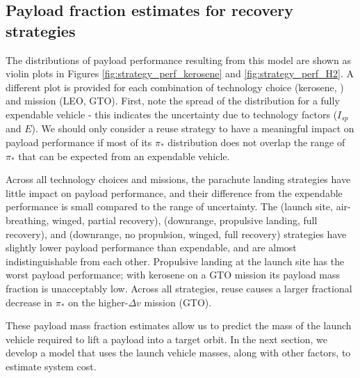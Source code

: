 \documentclass[conf]{new-aiaa}
\begin{document}
\begin{multicols}{2}
\subsection{Payload fraction estimates for recovery strategies}
The distributions of payload performance resulting from this model are shown as violin plots in Figures \ref{fig:strategy_perf_kerosene} and \ref{fig:strategy_perf_H2}. A different plot is provided for each combination of technology choice (kerosene, ) and mission (LEO, GTO). First, note the spread of the distribution for a fully expendable vehicle - this indicates the uncertainty due to technology factors ($I_{sp}$ and $E$). We should only consider a reuse strategy to have a meaningful impact on payload performance if most of its $\pi_*$ distribution does not overlap the range of $\pi_*$ that can be expected from an expendable vehicle.

Across all technology choices and missions, the parachute landing strategies have little impact on payload performance, and their difference from the expendable performance is small compared to the range of uncertainty. The (launch site, air-breathing, winged, partial recovery), (downrange, propulsive landing, full recovery), and (downrange, no propulsion, winged, full recovery)  strategies have slightly lower payload performance than expendable, and are almost indistinguishable from each other.  Propulsive landing at the launch site has the worst payload performance; with kerosene on a GTO mission its payload mass fraction is unacceptably low. Across all strategies, reuse causes a larger fractional decrease in $\pi_*$ on the higher-$\Delta v$ mission (GTO).

These payload mass fraction estimates allow us to predict the mass of the launch vehicle required to lift a payload into a target orbit. In the next section, we develop a model that uses the launch vehicle masses, along with other factors, to estimate system cost.


\end{multicols}
\end{document}
